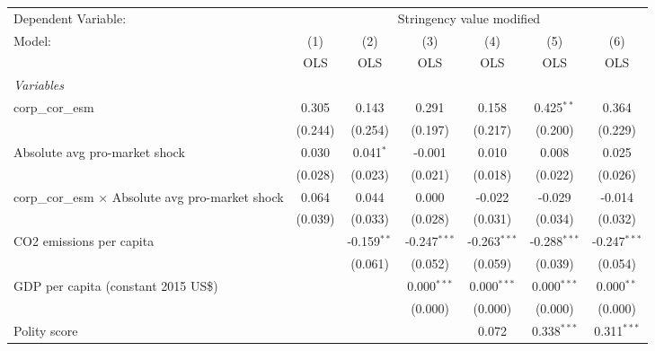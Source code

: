 
\begingroup
\centering
\begin{tabular}{lcccccc}
   \toprule
   Dependent Variable: & \multicolumn{6}{c}{Stringency value modified}\\
   Model:                                                   & (1)     & (2)           & (3)            & (4)            & (5)            & (6)\\  
                                                            &  OLS    & OLS           & OLS            & OLS            & OLS            & OLS\\  
   \midrule
   \emph{Variables}\\
   corp\_cor\_esm                                           & 0.305   & 0.143         & 0.291          & 0.158          & 0.425$^{**}$   & 0.364\\   
                                                            & (0.244) & (0.254)       & (0.197)        & (0.217)        & (0.200)        & (0.229)\\   
   Absolute avg pro-market shock                            & 0.030   & 0.041$^{*}$   & -0.001         & 0.010          & 0.008          & 0.025\\   
                                                            & (0.028) & (0.023)       & (0.021)        & (0.018)        & (0.022)        & (0.026)\\   
   corp\_cor\_esm $\times$ Absolute avg pro-market shock    & 0.064   & 0.044         & 0.000          & -0.022         & -0.029         & -0.014\\   
                                                            & (0.039) & (0.033)       & (0.028)        & (0.031)        & (0.034)        & (0.032)\\   
   CO2 emissions per capita                                 &         & -0.159$^{**}$ & -0.247$^{***}$ & -0.263$^{***}$ & -0.288$^{***}$ & -0.247$^{***}$\\   
                                                            &         & (0.061)       & (0.052)        & (0.059)        & (0.039)        & (0.054)\\   
   GDP per capita (constant 2015 US\$)                      &         &               & 0.000$^{***}$  & 0.000$^{***}$  & 0.000$^{***}$  & 0.000$^{**}$\\   
                                                            &         &               & (0.000)        & (0.000)        & (0.000)        & (0.000)\\   
   Polity score                                             &         &               &                & 0.072          & 0.338$^{***}$  & 0.311$^{***}$\\   

\end{tabular}
